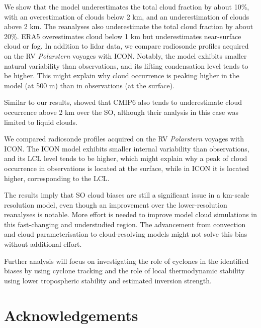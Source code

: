 \documentclass[12pt,a4paper]{article}
\begin{document}
We show that the model underestimates the total cloud fraction by about 10\%,
with an overestimation of clouds below 2 km, and an underestimation of clouds
above 2 km. The reanalyses also underestimate the total cloud fraction by about
20\%.  ERA5 overestimates cloud below 1 km but underestimates near-surface
cloud or fog. In addition to lidar data, we compare radiosonde profiles
acquired on the RV \textit{Polarstern} voyages with ICON. Notably, the model
exhibits smaller natural variability than observations, and its lifting
condensation level tends to be higher. This might explain why cloud occurrence
is peaking higher in the model (at 500 m) than in observations (at the
surface).

Similar to our results, \cite{cesana2022} showed that CMIP6 also tends to
underestimate cloud occurrence above 2 km over the SO, although their analysis
in this case was limited to liquid clouds.

We compared radiosonde profiles acquired on the RV \emph{Polarstern} voyages
with ICON.  The ICON model exhibits smaller internal variability than
observations, and its LCL level tends to be higher, which might explain why a
peak of cloud occurrence in observations is located at the surface, while in
ICON it is located higher, corresponding to the LCL.

The results imply that SO cloud biases are still a significant issue in a
km-scale resolution model, even though an improvement over the lower-resolution
reanalyses is notable. More effort is needed to improve model cloud simulations
in this fast-changing and understudied region. The advancement from convection
and cloud parameterisation to cloud-resolving models might not solve this bias
without additional effort.

Further analysis will focus on investigating the role of cyclones in the
identified biases by using cyclone tracking and the role of local thermodynamic
stability using lower tropospheric stability and estimated inversion strength.

\fontsize{12pt}{14pt}\selectfont
\section*{Acknowledgements}
\end{document}
